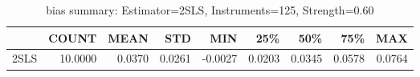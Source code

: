 \begin{table}[ht]
\centering
\caption{bias summary: Estimator=2SLS, Instruments=125, Strength=0.60}
\begin{tabular}{lrrrrrrrr}
\toprule
 & COUNT & MEAN & STD & MIN & 25\% & 50\% & 75\% & MAX \\
\midrule
2SLS & 10.0000 & 0.0370 & 0.0261 & -0.0027 & 0.0203 & 0.0345 & 0.0578 & 0.0764 \\
\bottomrule
\end{tabular}
\end{table}
